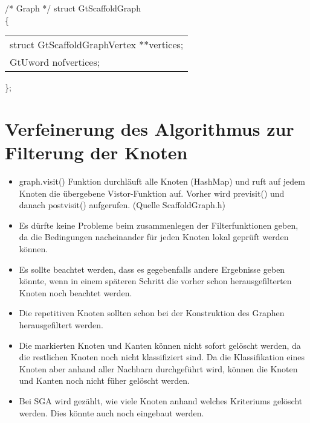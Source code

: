 \documentclass[a4paper,10pt,parskip]{scrartcl}
\begin{document}
/* Graph */
struct GtScaffoldGraph\\
\{\\
\begin{tabular}{l}
  struct GtScaffoldGraphVertex **vertices;\\
  GtUword nofvertices;
\end{tabular}
\};

\section{Verfeinerung des Algorithmus zur Filterung der Knoten}

\begin{itemize}
\item graph.visit() Funktion durchläuft alle Knoten (HashMap) und ruft
  auf jedem Knoten die übergebene Vistor-Funktion auf. Vorher wird
  previsit() und danach postvisit() aufgerufen. (Quelle
  ScaffoldGraph.h)
\item Es dürfte keine Probleme beim zusammenlegen der Filterfunktionen
  geben, da die Bedingungen nacheinander für jeden Knoten lokal
  geprüft werden können.
\item Es sollte beachtet werden, dass es gegebenfalls andere
  Ergebnisse geben könnte, wenn in einem späteren Schritt die vorher
  schon herausgefilterten Knoten noch beachtet werden.
\item Die repetitiven Knoten sollten schon bei der Konstruktion des
  Graphen herausgefiltert werden.
\item Die markierten Knoten und Kanten können nicht sofort gelöscht
  werden, da die restlichen Knoten noch nicht klassifiziert sind. Da
  die Klassifikation eines Knoten aber anhand aller Nachbarn
  durchgeführt wird, können die Knoten und Kanten noch nicht füher
  gelöscht werden.
\item Bei SGA wird gezählt, wie viele Knoten anhand welches Kriteriums
  gelöscht werden. Dies könnte auch noch eingebaut werden.
\end{itemize}
\end{document}
